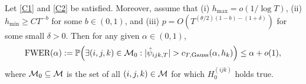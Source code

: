 \documentclass[a4paper,12pt]{article}
\numberwithin{equation}{section}
\begin{document}
\begin{theoremA}\label{theo1}
Let \ref{C1} and \ref{C2} be satisfied. Moreover, assume that (i) $h_{\max} = o(1/\log T)$, (ii) $h_{\min} \ge CT^{-b}$ for some $b \in (0,1)$, and (iii) $p = O(T^{(\theta/2)(1-b)-(1+\delta)})$ for some small $\delta > 0$. Then for any given $\alpha \in (0,1)$,
\[ \textnormal{FWER}(\alpha) := \mathbb{P} \Big( \exists (i,j,k) \in \mathcal{M}_0: |\hat{\psi}_{ijk,T}| > c_{T,\textnormal{Gauss}}(\alpha,h_k) \Big) \le \alpha + o(1), \]
where $\mathcal{M}_0 \subseteq \mathcal{M}$ is the set of all $(i,j,k) \in \mathcal{M}$ for which $H_0^{(ijk)}$ holds true. 
\end{theoremA}
\end{document}
